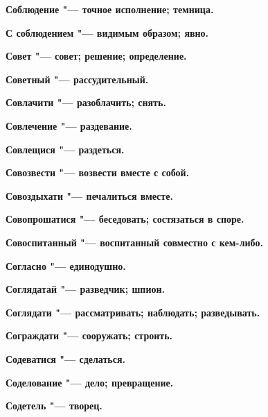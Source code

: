 \bfseries Соблюдение \normalfont{} "--- точное исполнение; темница. 




\bfseries С соблюдением \normalfont{} "--- видимым образом; явно. 




\bfseries Совет \normalfont{} "--- совет; решение; определение. 




\bfseries Советный \normalfont{} "--- рассудительный. 




\bfseries Совлачити \normalfont{} "--- разоблачить; снять. 




\bfseries Совлечение \normalfont{} "--- раздевание. 




\bfseries Совлещися \normalfont{} "--- раздеться. 




\bfseries Совозвести \normalfont{} "--- возвести вместе с собой. 




\bfseries Совоздыхати \normalfont{} "--- печалиться вместе. 




\bfseries Совопрошатися \normalfont{} "--- беседовать; состязаться в споре. 




\bfseries Совоспитанный \normalfont{} "--- воспитанный совместно с кем-либо. 




\bfseries Согласно \normalfont{} "--- единодушно. 




\bfseries Соглядатай \normalfont{} "--- разведчик; шпион. 




\bfseries Соглядати \normalfont{} "--- рассматривать; наблюдать; разведывать. 




\bfseries Сограждати \normalfont{} "--- сооружать; строить. 




\bfseries Содеватися \normalfont{} "--- сделаться. 




\bfseries Соделование \normalfont{} "--- дело; превращение. 




\bfseries Содетель \normalfont{} "--- творец. 




